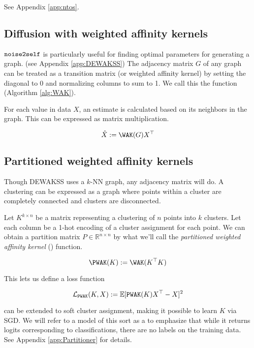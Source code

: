 See Appendix \ref{app:ntos}.

\subsection{Diffusion with weighted affinity kernels}

$\mathop{\mathtt{noise2self}}\limits$ is particularly useful for finding optimal parameters for generating a graph\cite{tjarnberg2021}.
(see Appendix \ref{app:DEWAKSS})
The adjacency matrix $G$ of any graph can be treated as a transition matrix (or weighted affinity kernel) by setting the diagonal to 0 and normalizing columns to sum to 1. We call this the \WAK function (Algorithm \ref{alg:WAK}).

For each value in data $X$, an estimate is calculated based on its neighbors in the graph. This can be expressed as matrix multiplication.

\begin{equation}
  \label{eq:WAK}
\hat{X} := \WAK(G)X^\top
\end{equation}


\subsection{Partitioned weighted affinity kernels} 

Though DEWAKSS uses a $k$-NN graph, any adjacency matrix will do.
A clustering can be expressed as a graph where points within a cluster are completely connected and clusters are disconnected.

Let $K^{k \times n}$ be a matrix representing a clustering of $n$ points into $k$ clusters. Let each column be a 1-hot encoding of a cluster assignment for each point. We can obtain a partition matrix $P \in \mathbb{R}^{n \times n}$ by what we'll call the \textit{partitioned weighted affinity kernel} (\PWAK) function.

\begin{equation}
  \label{eq:PWAK}
  \PWAK(K) := \WAK(K^\top K)
\end{equation}

This lets us define a loss function

\begin{equation}
  \mathcal{L}_{\mathop{\mathtt{PWAK}}\limits}(K,X) := \mathbb{E}[\mathop{\mathtt{PWAK}}\limits(K)X^\top - X]^2
\end{equation}


\PWAK can be extended to soft cluster assignment, making it possible to learn $K$ via SGD.
We will refer to a model of this sort as a \Partitioner to emphasize that while it returns logits corresponding to classifications, there are no labels on the training data.
See Appendix \ref{app:Partitioner} for details.

